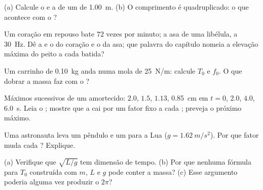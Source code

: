 \begin{exercise}[$\star$]\label{exo:g12:oscillators-and-time:1}
(a) Calcule o  e a  de um  de \qty{1.00}{m}. (b) O
comprimento é quadruplicado: o que acontece com o ?
\end{exercise}

\begin{exercise}[$\star$]\label{exo:g12:oscillators-and-time:2}
Um coração em repouso bate $72$ vezes por minuto; a asa de uma libélula, a
\qty{30}{Hz}. Dê a  e o  do coração e o  da asa; que palavra do
capítulo nomeia a elevação máxima do peito a cada batida?
\end{exercise}

\begin{exercise}[$\star$]\label{exo:g12:oscillators-and-time:3}
Um carrinho de \qty{0.10}{kg} anda numa mola de \qty{25}{N/m}: calcule $T_0$ e $f_0$. O
que dobrar a massa faz com o ?
\end{exercise}

\begin{exercise}[$\star$]\label{exo:g12:oscillators-and-time:4}
Máximos sucessivos de um  amortecido: $2.0$, $1.5$, $1.13$, \qty{0.85}{cm} em
$t = 0$, $2.0$, $4.0$, \qty{6.0}{s}. Leia o ; mostre que a  cai
por um fator fixo a cada ; preveja o próximo máximo.
\end{exercise}

\begin{exercise}[$\star$]\label{exo:g12:oscillators-and-time:5}
Uma astronauta leva um pêndulo e um  para a Lua
($g = \qty{1.62}{m/s^2}$). Por que fator muda cada ? Explique.
\end{exercise}

\begin{exercise}[$\star\star$]\label{exo:g12:oscillators-and-time:6}
(a) Verifique que $\sqrt{L/g}$ tem dimensão de tempo. (b) Por que nenhuma fórmula para
$T_0$ construída com $m$, $L$ e $g$ pode conter a massa? (c) Esse argumento poderia
alguma vez produzir o $2\pi$?
\end{exercise}

